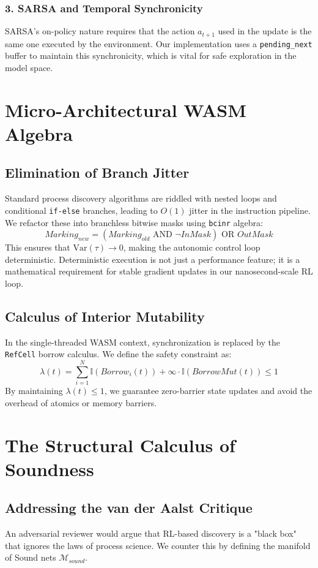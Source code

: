 \documentclass[12pt,a4paper]{report}
\begin{document}
\subsection{3. SARSA and Temporal Synchronicity}
SARSA's on-policy nature requires that the action $a_{t+1}$ used in the update is the same one executed by the environment. Our implementation uses a \texttt{pending\_next} buffer to maintain this synchronicity, which is vital for safe exploration in the model space.

\chapter{Micro-Architectural WASM Algebra}
\section{Elimination of Branch Jitter}
Standard process discovery algorithms are riddled with nested loops and conditional \texttt{if-else} branches, leading to $O(1)$ jitter in the instruction pipeline. We refactor these into branchless bitwise masks using \texttt{bcinr} algebra:
\begin{equation}
Marking_{new} = (Marking_{old} \text{ AND } \neg InMask) \text{ OR } OutMask
\end{equation}
This ensures that $\text{Var}(\tau) \to 0$, making the autonomic control loop deterministic. Deterministic execution is not just a performance feature; it is a mathematical requirement for stable gradient updates in our nanosecond-scale RL loop.

\section{Calculus of Interior Mutability}
In the single-threaded WASM context, synchronization is replaced by the \texttt{RefCell} borrow calculus. We define the safety constraint as:
\begin{equation}
\lambda(t) = \sum_{i=1}^N \mathbb{I}(Borrow_i(t)) + \infty \cdot \mathbb{I}(BorrowMut(t)) \leq 1
\end{equation}
By maintaining $\lambda(t) \leq 1$, we guarantee zero-barrier state updates and avoid the overhead of atomics or memory barriers.

\chapter{The Structural Calculus of Soundness}
\section{Addressing the van der Aalst Critique}
An adversarial reviewer would argue that RL-based discovery is a "black box" that ignores the laws of process science. We counter this by defining the manifold of Sound nets $\mathcal{M}_{sound}$.
\end{document}
